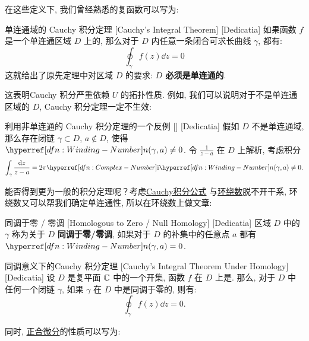        在这些定义下, 我们曾经熟悉的复函数可以写为: 

        \begin{thm}
            {单连通域的 Cauchy 积分定理}
            [Cauchy's Integral Theorem]
            [Dedicatia]
            如果函数 \(f\) 是一个单连通区域 \(D\) 上的\Analytic{}, 那么对于 \(D\) 内任意一条闭合可求长曲线 \(\gamma\), 都有: 
            \[\oint_{\gamma} f(z) \dd z = 0\]
            这就给出了原先定理中对区域 \(D\) 的要求: \textbf{ \(D\) 必须是单连通的}. 
        \end{thm}

        这表明Cauchy 积分严重依赖 \(U\) 的拓扑性质. 例如, 我们可以说明对于不是单连通区域的 \(D\), Cauchy 积分定理一定不生效: 

        \begin{cxmp}
            {利用非单连通的 Cauchy 积分定理的一个反例}
            []
            [Dedicatia]
            假如 \(D\) 不是单连通域, 那么存在闭链 \(\gamma\subset D\),  \(a\notin D\), 使得 \(\Windn(\gamma,a)\neq 0\). 令 \(\frac{1}{z-a}\) 在 \(D\) 上解析, 考虑积分
            \[\int_\gamma\frac{\dd{z}}{z-a}=2\pi\ii \Windn(\gamma,a)\neq 0.\]
        \end{cxmp}

        能否得到更为一般的积分定理呢？考虑\hyperref[thm:Cauchy-Int-Formula]{Cauchy积分公式} 与\hyperref[dfn:Winding-Number]{环绕数}脱不开干系, 环绕数又可以帮我们确定单连通性, 所以在环绕数上做文章: 

        \begin{dfn}
            {同调于零 / 零调}
            [Homologous to Zero / Null Homology]
            [Dedicatia]
            区域 \(D\) 中的 \(\gamma\) 称为关于 \(D\) \textbf{同调于零/零调}, 如果对于 \(D\) 的补集中的任意点 \(a\) 都有 \(\Windn(\gamma,a)=0\).
        \end{dfn}
        
        \begin{thm}
            {同调意义下的Cauchy 积分定理}
            [Cauchy's Integral Theorem Under Homology]
            [Dedicatia]
            设 \(D\) 是复平面 \(\operatorname{\mathbb{C}}\) 中的一个开集, 函数 \(f\) 在 \(D\) 上是\Analytic{}. 那么, 对于 \(D\) 中任何一个闭链 \(\gamma\), 如果 \(\gamma\) 在 \(D\) 中是同调于零的, 则有: 
            \[\oint_{\gamma} f(z) \dd z = 0.\]
        \end{thm}

        同时, \hyperref[dfn:Exact-Differential]{正合微分}的性质可以写为: 

